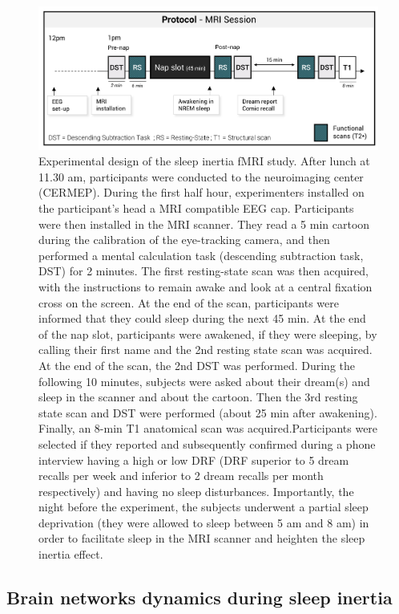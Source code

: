 \begin{figure}[htb]
	\includegraphics[width=\textwidth]{Fig/Intro/Intro_paradigm_fMRI/Intro_paradigm_fMRI.png}
	\caption[Experimental design of the fMRI study]{Experimental design of the sleep inertia fMRI study. After lunch at 11.30 am, participants were conducted to the neuroimaging center (CERMEP). During the first half hour, experimenters installed on the participant’s head a MRI compatible EEG cap. Participants were then installed in the MRI scanner. They read a 5 min cartoon during the calibration of the eye-tracking camera, and then performed a mental calculation  task (descending subtraction task, DST) for 2 minutes. The first resting-state scan was then acquired, with the instructions to remain awake and look at a central fixation cross on the screen. At the end of the scan, participants were informed that they could sleep during the next 45 min. At the end of the nap slot, participants were awakened, if they were sleeping, by calling their first name and the 2nd resting state scan was acquired. At the end of the scan, the 2nd DST was performed. During the following 10 minutes, subjects were asked about their dream(s) and sleep in the scanner and about the cartoon. Then the 3rd resting state scan and DST were performed (about 25 min after awakening). Finally, an 8-min T1 anatomical scan was acquired.Participants were selected if they reported and subsequently confirmed during a phone interview having a high or low DRF (DRF superior to 5 dream recalls per week and inferior to 2 dream recalls per month respectively) and having no sleep disturbances. Importantly, the night before the experiment, the subjects underwent a partial sleep deprivation (they were allowed to sleep between 5 am and 8 am) in order to facilitate sleep in the MRI scanner and heighten the sleep inertia effect.}
	\label{fig:intro:problematics-fmri-paradigm}
\end{figure}

\subsection{Brain networks dynamics during sleep inertia}
\label{sec:problematic:inertia:overview}


